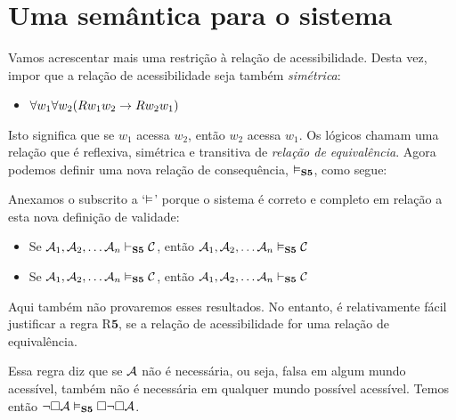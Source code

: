 \section{Uma semântica para o sistema \mlSfive}
\label{SemanticsS5}

Vamos acrescentar mais uma restrição à relação de acessibilidade. Desta vez, impor que a relação de acessibilidade seja também \emph{simétrica}:
\begin{itemize}
	\item $\forall w_1\forall w_2(Rw_1w_2 \rightarrow Rw_2w_1)$
\end{itemize}
Isto significa que se  $w_1$ acessa $w_2$, então $w_2$ acessa  $w_1$. Os lógicos chamam uma relação que é reflexiva, simétrica e transitiva de \emph{relação de equivalência}. Agora podemos  definir uma nova relação de consequência, $\vDash_{\mathbf{S5}} $, como segue:

Anexamos o subscrito \mlSfive{} a `$\vDash$' porque  o sistema \mlSfive{} é correto e completo em relação a esta nova definição de validade:

\begin{itemize}
	\item Se $\mathcal{A}_1,\mathcal{A}_2, \dots \mathcal{A}_n\vdash_{\mathbf{S5}} \mathcal{C}$, então $\mathcal{A}_1,\mathcal{A}_2, \dots \mathcal{A}_n\vDash_{\mathbf{S5}} \mathcal{C}$
	\item Se $\mathcal{A}_1,\mathcal{A}_2, \dots \mathcal{A}_n\vDash_{\mathbf{S5}} \mathcal{C}$, então $\mathcal{A}_1,\mathcal{A}_2, \dots \mathcal{A}_n\vdash_{\mathbf{S5}} \mathcal{C}$
\end{itemize}
Aqui também não provaremos esses resultados.  No entanto, é relativamente fácil  justificar  a  regra   R$\mathbf{5}$,  se a relação de acessibilidade for uma relação de equivalência.



Essa regra diz que se $\mathcal{A}$ não é necessária, ou seja, falsa em algum mundo acessível, também não é necessária em qualquer mundo possível acessível. 
 Temos então $\neg\Box \mathcal{A} \vDash_{\mathbf{S5}} \Box\neg\Box \mathcal{A}$.

